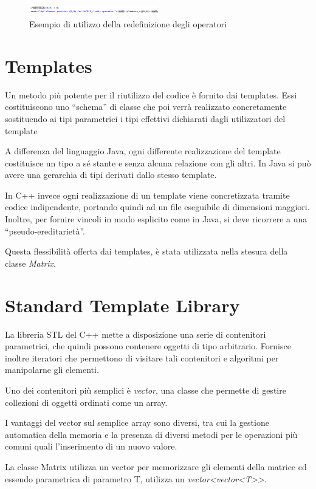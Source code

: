 \begin{figure}[h]
	\centering
	\includegraphics[width=0.5\textwidth]{Immagini/OperatorExample.png}
	\caption{Esempio di utilizzo della redefinizione degli operatori}
	\label{fig:OperatorExamples}
\end{figure}

\section{Templates}
Un metodo più potente per il riutilizzo del codice è fornito dai templates. Essi costituiscono
uno “schema” di classe che poi verrà realizzato concretamente sostituendo ai tipi parametrici i
tipi effettivi dichiarati dagli utilizzatori del template

A differenza del linguaggio Java, ogni differente realizzazione del template costituisce un tipo
a sé stante e senza alcuna relazione con gli altri. In Java si può avere una gerarchia di tipi
derivati dallo stesso template.

In C++ invece ogni realizzazione di un template viene concretizzata tramite codice
indipendente, portando quindi ad un file eseguibile di dimensioni maggiori. Inoltre, per fornire
vincoli in modo esplicito come in Java, si deve ricorrere a una “pseudo-ereditarietà”.

Questa flessibilità offerta dai templates, è stata utilizzata nella stesura della classe \textit{Matrix}.

\section{Standard Template Library}
La libreria STL del C++ mette a disposizione una serie di contenitori parametrici, che quindi
possono contenere oggetti di tipo arbitrario. Fornisce inoltre iteratori che permettono di visitare
tali contenitori e algoritmi per manipolarne gli elementi.

Uno dei contenitori più semplici è \textit{vector}, una classe che permette di gestire collezioni di oggetti ordinati come un array.

I vantaggi del vector sul semplice array sono diversi, tra cui la gestione automatica della
memoria e la presenza di diversi metodi per le operazioni più comuni quali l'inserimento di un
nuovo valore.

La classe Matrix utilizza un vector per memorizzare gli elementi della matrice ed essendo
parametrica di parametro T, utilizza un \textit{vector<vector<T>>}.
